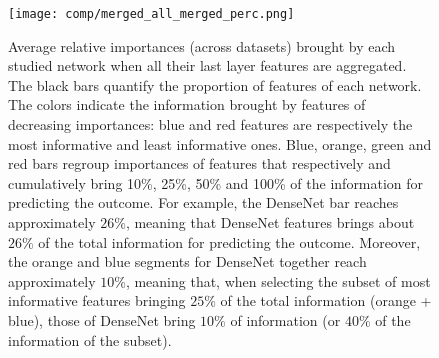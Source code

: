\begin{figure}
    \centering
    \texttt{[image: comp/merged\_all\_merged\_perc.png]}
    \caption{Average relative importances (across datasets) brought by each studied network when all their last layer features are aggregated. The black bars quantify the proportion of features of each network. The colors indicate the information brought by features of decreasing importances: blue and red features are respectively the most informative and least informative ones. Blue, orange, green and red bars regroup importances of features that respectively and cumulatively bring 10\%, 25\%, 50\% and 100\% of the information for predicting the outcome. For example, the DenseNet bar reaches approximately $26\%$, meaning that DenseNet features brings about $26\%$ of the total information for predicting the outcome. Moreover, the orange and blue segments for DenseNet together reach approximately $10\%$, meaning that, when selecting the subset of most informative features bringing $25\%$ of the total information (orange + blue), those of DenseNet bring $10\%$ of information (or $40\%$ of the information of the subset).}
    \label{fig:comp:models_merged_avg_imp}
\end{figure} 

